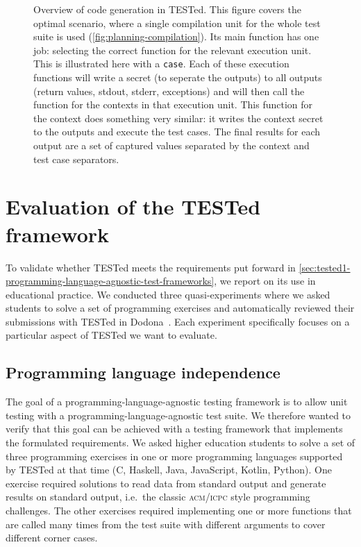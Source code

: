 \documentclass[../main]{subfiles}
\begin{document}
\begin{figure}
    \centering
    
    \caption{Overview of code generation in TESTed.
        This figure covers the optimal scenario, where a single compilation unit for the whole test suite is used (\cref{fig:planning-compilation}).
        Its main function has one job: selecting the correct function for the relevant execution unit.
        This is illustrated here with a \texttt{case}.
        Each of these execution functions will write a secret (to seperate the outputs) to all outputs (return values, stdout, stderr, exceptions) and will then call the function for the contexts in that execution unit.
        This function for the context does something very similar: it writes the context secret to the outputs and execute the test cases.
        The final results for each output are a set of captured values separated by the context and test case separators.
    }
    \label{fig:generated-code}
\end{figure}

\section{Evaluation of the TESTed framework}\label{sec:tested1-evaluating-tested}

To validate whether TESTed meets the requirements put forward in \cref{sec:tested1-programming-language-agnostic-test-frameworks}, we report on its use in educational practice.
We conducted three quasi-experiments where we asked students to solve a set of programming exercises and automatically reviewed their submissions with TESTed in Dodona~\autocite{vanpetegemDodonaLearnCode2023}.
Each experiment specifically focuses on a particular aspect of TESTed we want to evaluate.

\subsection{Programming language independence}\label{subsec:programming-language-independence}

The goal of a programming-language-agnostic testing framework is to allow unit testing with a programming-language-agnostic test suite.
We therefore wanted to verify that this goal can be achieved with a testing framework that implements the formulated requirements.
We asked higher education students to solve a set of three programming exercises in one or more programming languages supported by TESTed at that time (C, Haskell, Java, JavaScript, Kotlin, Python).
One exercise required solutions to read data from standard output and generate results on standard output, i.e.\ the classic \textsc{acm/icpc} style programming challenges.
The other exercises required implementing one or more functions that are called many times from the test suite with different arguments to cover different corner cases.
\end{document}
